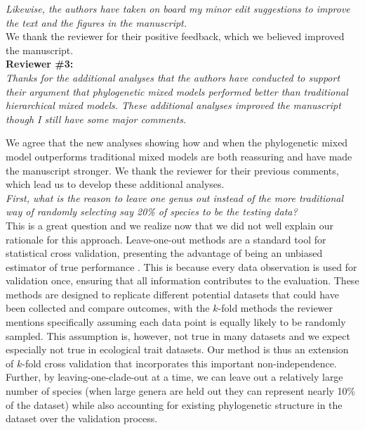 \documentclass[11pt]{article}
\begin{document}
\emph{Likewise, the authors have taken on board my minor edit suggestions to improve the text and the figures in the manuscript.}\\

We thank the reviewer for their positive feedback, which we believed improved the manuscript.\\ %

{\bf Reviewer \#3:}\\ 


\emph{Thanks for the additional analyses that the authors have conducted to support their argument that phylogenetic mixed models performed better than traditional hierarchical mixed models. These additional analyses improved the manuscript though I still have some major comments.}

We agree that the new analyses showing how and when the phylogenetic mixed model outperforms traditional mixed models are both reassuring and have made the manuscript stronger. We thank the reviewer for their previous comments, which lead us to develop these additional analyses. \\


\emph{First, what is the reason to leave one genus out instead of the more traditional way of randomly selecting say 20\% of species to be the testing data? }\\

This is a great question and we realize now that we did not well explain our rationale for this approach. Leave-one-out methods are a standard tool for statistical cross validation, presenting the advantage of being an unbiased estimator of true performance \citep{geroldinger2023leave}. This is because every data observation is used for validation once, ensuring that all information contributes to the evaluation. These methods are designed to replicate different potential datasets that could have been collected and compare outcomes, with the $k$-fold methods the reviewer mentions specifically assuming each data point is equally likely to be randomly sampled. This assumption is, however, not true in many datasets and we expect especially not true in ecological trait datasets. Our method is thus an extension of  $k$-fold cross validation that incorporates this important non-independence. Further, by leaving-one-clade-out at a time, we can leave out a relatively large number of species (when large genera are held out they can represent nearly 10\% of the dataset) while also accounting for existing phylogenetic structure in the dataset over the validation process.
\end{document}
